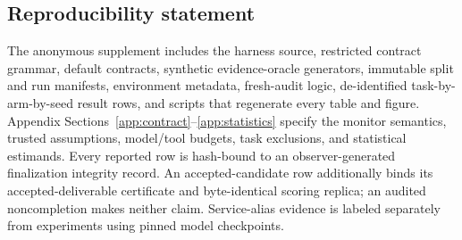 \documentclass{article}
\begin{document}
\subsection*{Reproducibility statement}
The anonymous supplement includes the harness source, restricted contract
grammar, default contracts, synthetic evidence-oracle generators, immutable
split and run manifests, environment metadata, fresh-audit logic, de-identified
task-by-arm-by-seed result rows, and scripts that regenerate every table and
figure. Appendix
Sections~\ref{app:contract}--\ref{app:statistics} specify the monitor semantics,
trusted assumptions, model/tool budgets, task exclusions, and statistical
estimands. Every reported row is hash-bound to an observer-generated
finalization integrity record. An accepted-candidate row additionally binds its
accepted-deliverable certificate and byte-identical scoring replica; an audited
noncompletion makes neither claim. Service-alias evidence is labeled separately
from experiments using pinned model checkpoints.




\appendix

\end{document}
